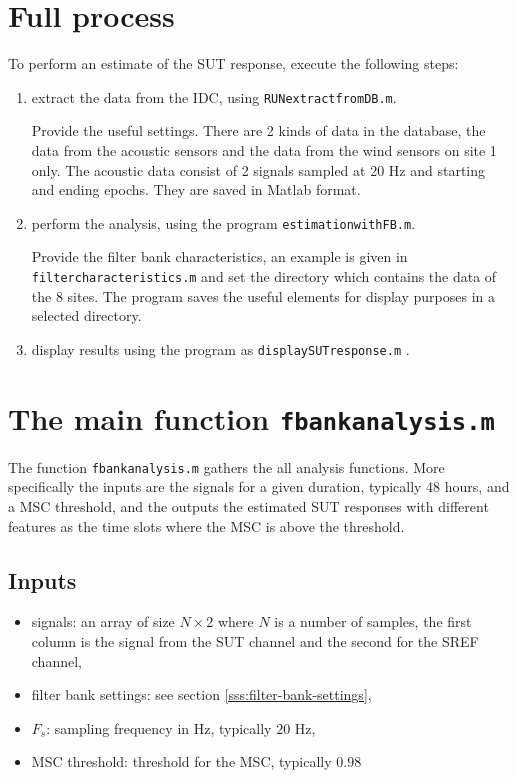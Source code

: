 

\section{Full process}
To perform an estimate of the SUT response, execute the following steps:
\begin{enumerate}
\item
extract the data from the IDC, using {\tt RUNextractfromDB.m}. 
 
Provide the useful settings. There are 2 kinds of data in the database, the data from the acoustic sensors and the data from the wind sensors on site 1 only. The acoustic data consist of 2 signals sampled at 20 Hz and starting and ending epochs. They are saved in Matlab format. 
\item
perform the analysis, using the program {\tt estimationwithFB.m}.

Provide the filter bank characteristics, an example is given in {\tt filtercharacteristics.m} and set the directory which contains the data of the $8$ sites. The program saves the useful elements for display purposes in a selected directory.
 \item
display results using the program as {\tt displaySUTresponse.m} .

\end{enumerate}


\section{The main function {\tt fbankanalysis.m}}
The function {\tt fbankanalysis.m}  gathers the all analysis functions. More specifically the inputs are the signals for a given duration, typically 48 hours, and a MSC threshold, and the outputs the estimated SUT responses with different features as the time slots where the MSC is above the  threshold.

\subsection{Inputs}
\begin{itemize}
\item
signals: an array of size $N\times 2$ where $N$ is a number of samples, the first column is the signal from the SUT channel and the second for the SREF channel,
\item
filter bank settings: see section \ref{sss:filter-bank-settings},
\item
$F_s$: sampling frequency in Hz, typically $20$ Hz,
\item
MSC threshold: threshold for the MSC, typically $0.98$
\end{itemize}


